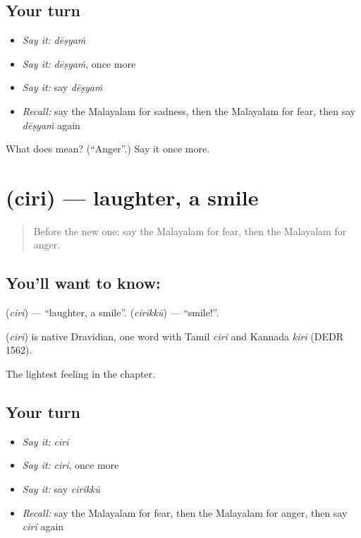 \subsection*{Your turn}
\begin{itemize}
\raggedright
  \item \emph{Say it:} \emph{dēṣyaṁ}
  \item \emph{Say it:} \emph{dēṣyaṁ}, once more
  \item \emph{Say it:} say \emph{dēṣyaṁ}
  \item \emph{Recall:} say the Malayalam for sadness, then the Malayalam for fear, then say \emph{dēṣyaṁ} again
\end{itemize}

\begin{tcolorbox}[breakable,colback=teal!4,colframe=teal!35!black,title={Before you move on}]
What does  mean? (\textquotedblleft{}Anger\textquotedblright{}.) Say it once more.
\end{tcolorbox}
\section[\texorpdfstring{\ml{ചിരി} (ciri)}{ചിരി (ciri)}]{ (ciri) — laughter, a smile}

\label{lesson:ML-C116-laughter}



\begin{quote}
Before the new one: say the Malayalam for fear, then the Malayalam for anger.
\end{quote}

\subsection*{You'll want to know: }
\textbf{} (\emph{ciri}) — \textquotedblleft{}laughter, a smile\textquotedblright{}. \textbf{} (\emph{cirikkū}) — \textquotedblleft{}smile!\textquotedblright{}.

\begin{cousinweb}
\textbf{} (\emph{ciri}) is native Dravidian, one word with Tamil \emph{ciri} and Kannada \emph{kiri} (DEDR 1562).
\end{cousinweb}

\begin{grammarlens}[title={What you've built}]
The lightest feeling in the chapter.
\end{grammarlens}

\subsection*{Your turn}
\begin{itemize}
\raggedright
  \item \emph{Say it:} \emph{ciri}
  \item \emph{Say it:} \emph{ciri}, once more
  \item \emph{Say it:} say \emph{cirikkū}
  \item \emph{Recall:} say the Malayalam for fear, then the Malayalam for anger, then say \emph{ciri} again
\end{itemize}

